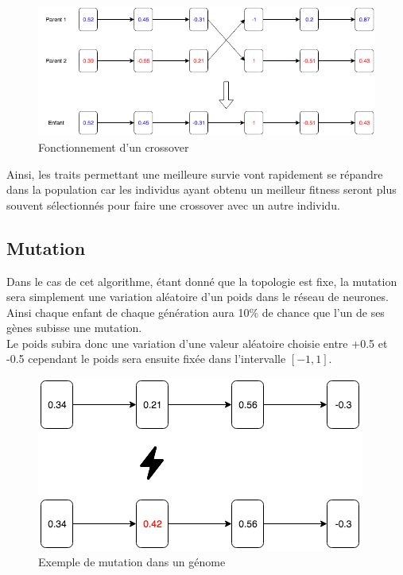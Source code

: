 \documentclass{article}
\begin{document}
\begin{figure}[H]
\begin{center}
	\includegraphics[scale=0.6]{"crossover.png"} 
	\caption{Fonctionnement d'un crossover}
\end{center}
\end{figure}

Ainsi, les traits permettant une meilleure survie vont rapidement se répandre dans la population car les individus ayant obtenu un meilleur fitness seront plus souvent sélectionnés pour faire une crossover avec un autre individu.

\subsection{Mutation}

Dans le cas de cet algorithme, étant donné que la topologie est fixe, la mutation sera simplement une variation aléatoire d'un poids dans le réseau de neurones. Ainsi chaque enfant de chaque génération aura 10\% de chance que l'un de ses gènes subisse une mutation.\\
Le poids subira donc une variation d'une valeur aléatoire choisie entre +0.5 et -0.5 cependant le poids sera ensuite fixée dans l'intervalle $[-1, 1]$.

\begin{figure}[H]
\begin{center}
	\includegraphics[scale=0.6]{mutation.png}
	\caption{Exemple de mutation dans un génome}
\end{center}
\end{figure}
\end{document}
